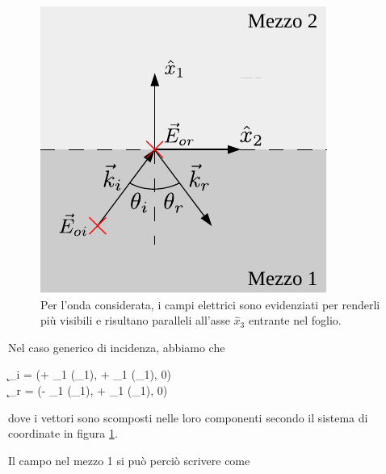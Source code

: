 	\begin{figure}[ht] \label{fig:campi_incidenza_non_normale_isolanti}
		\centering
		\includegraphics{img/campi_incidenza_non_normale.pdf}
		 \caption{Per l'onda considerata, i campi elettrici sono evidenziati per renderli più visibili e risultano paralleli all'asse $\hat{x}_3$ entrante nel foglio.}
	\end{figure}
	
	Nel caso generico di incidenza, abbiamo che
	\begin{esp}
		\begin{cases}
			\k_i = (+ \beta_1 \cos(\theta_1), + \beta_1 \sin(\theta_1), 0) \\
			\k_r = (- \beta_1 \cos(\theta_1), + \beta_1 \sin(\theta_1), 0)
		\end{cases}
	\end{esp}
	dove i vettori sono scomposti nelle loro componenti secondo il sistema di coordinate in figura \ref{fig:campi_incidenza_non_normale_isolanti}.
	
	Il campo nel mezzo 1 si può perciò scrivere come 



















